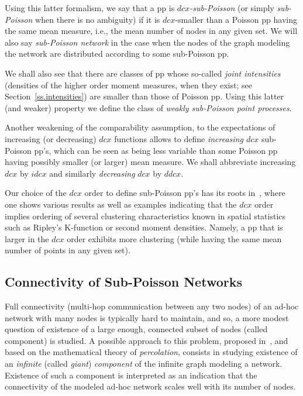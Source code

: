 \documentclass[conference]{IEEEtran}
\begin{document}
Using this latter formalism, we say that a  pp
is {\em \hbox{$dcx$-}sub-Poisson}  (or simply {\em sub-Poisson} when there
is no ambiguity) if it is $dcx$-smaller than a Poisson
pp having the same mean measure, i.e., 
the mean number of nodes in any given set.
We will also say {\em sub-Poisson network} in the case when 
the nodes of the graph modeling  the network are distributed according
to some sub-Poisson pp.

We shall also  see that there are classes of pp whose so-called 
{\em joint intensities} (densities of the higher order moment
measures, when they 
exist;  see Section~\ref{ss.intensities})  are
smaller than those of Poisson pp. Using this latter (and weaker) property
we define the class of {\em weakly sub-Poisson point processes}.  

Another weakening of the comparability assumption, to the expectations of
increasing (or decreasing) $dcx$ functions 
allows to define  {\em increasing $dcx$} sub-Poisson pp's, which 
can be seen as being less variable than some Poisson pp 
having  possibly smaller (or larger) mean measure. We shall abbreviate increasing $dcx$ by $idcx$ and 
similarly {\em decreasing} $dcx$ by $ddcx$.

Our choice of the $dcx$ order to define sub-Poisson  pp's 
has its roots in~\cite{snorder}, where one shows various results as
well as examples indicating that the $dcx$ order implies ordering
of several  clustering characteristics known in spatial statistics
such as Ripley's K-function or second moment densities.
Namely, a  pp that is larger in the $dcx$ order exhibits
more clustering (while having the same mean number of points in any given set).

\subsection{Connectivity of Sub-Poisson Networks}

Full connectivity  (multi-hop communication between any two nodes)
of an ad-hoc network with many nodes
is typically hard to maintain, and so, a more modest
question of existence of a large enough, connected subset of nodes
(called component) is studied. A possible approach to this  problem,
proposed in~\cite{Gilbert61}, and based on the mathematical 
theory of {\em percolation}, consists in studying existence of an
{\em infinite} (called {\em giant}) {\em component} of the  
infinite graph modeling a network.
Existence of such a component 
is interpreted as an indication that the connectivity of 
the modeled  ad-hoc network scales well with its number of nodes.
\end{document}
